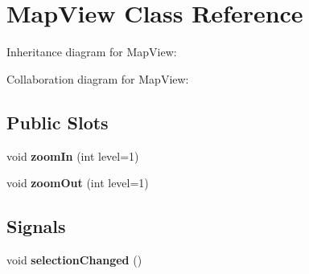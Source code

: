 \hypertarget{classMapView}{}\section{Map\+View Class Reference}
\label{classMapView}


Inheritance diagram for Map\+View\+:


Collaboration diagram for Map\+View\+:
\subsection*{Public Slots}
\begin{DoxyCompactItemize}
\item 
void {\bfseries zoom\+In} (int level=1)\hypertarget{classMapView_a0c0d9fe53da43fd8cfadf9203fb7d61e}{}\label{classMapView_a0c0d9fe53da43fd8cfadf9203fb7d61e}

\item 
void {\bfseries zoom\+Out} (int level=1)\hypertarget{classMapView_a1cb63fdc695345f1dcecc2fef560cfab}{}\label{classMapView_a1cb63fdc695345f1dcecc2fef560cfab}

\end{DoxyCompactItemize}
\subsection*{Signals}
\begin{DoxyCompactItemize}
\item 
void {\bfseries selection\+Changed} ()\hypertarget{classMapView_a55f7517be6358639befca8a6f95ed471}{}\label{classMapView_a55f7517be6358639befca8a6f95ed471}

\end{DoxyCompactItemize}
